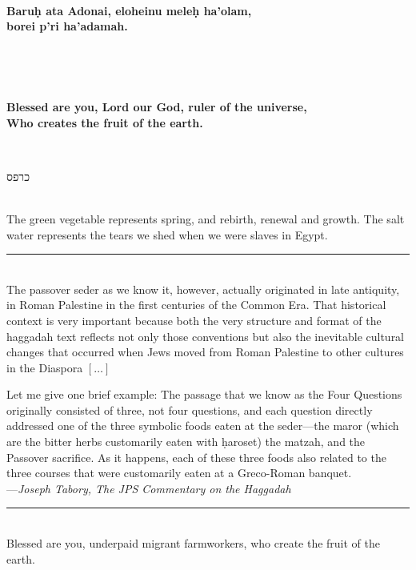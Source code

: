 \documentclass[a4paper,12pt,openany]{memoir}
\newcommand{\HgInst}[1]{{\noindent\sffamily{\bfseries{#1}}}}
\newcommand{\HgEllipsis}{\ensuremath{\left[\ldots\right]}}
\newcommand{\HgSource}[1]{\hfill{\small---\itshape{#1}}}
\newcommand{\hchapter}[1]{
  \begin{hebrew}
    \begin{Spacing}{.97}
      \newpage
      \strut

      \vspace{.15em}

      \noindent\Huge #1

      \vspace{1em}
    \end{Spacing}
  \end{hebrew}
}
\newcommand{\HgHL}[1]{{\Large\textbf{#1}\par\noindent\\[-.5em]}}
\newcommand{\HgFill}{\vfill \hrule \vfill}
\newenvironment{HgEnglish}{\strut\\\noindent}{\vspace{1em}}
\newenvironment{HgTranslit}{\strut\\\noindent\begin{itshape}}{\end{itshape}\vspace{1em}}
\newcommand{\SSrc}{\textsuperscript{\upshape{[S]}}}
\begin{document}
\begin{HgTranslit}
  \HgHL{
  Baru\d{h} ata Adonai, eloheinu mele\d{h} ha'olam, \\
  borei p'ri ha'adamah.
}
\end{HgTranslit}
\vspace{-1em}
\begin{HgEnglish}
  \HgHL{
  Blessed are you, Lord our God, ruler of the universe, \\
  Who creates the fruit of the earth.
  }
\end{HgEnglish}

\HgInst{Eat the parsely.}

\vfill

\hchapter{כרפס}

\begin{HgEnglish}
The green vegetable represents spring, and rebirth, renewal and growth. The salt
water represents the tears we shed when we were slaves in Egypt.
\end{HgEnglish}

\HgFill

\begin{HgEnglish}
  The passover seder as we know it, however, actually originated in late
  antiquity, in Roman Palestine in the first centuries of the Common Era. That
  historical context is very important because both the very structure and
  format of the haggadah text reflects not only those conventions but also the
  inevitable cultural changes that occurred when Jews moved from Roman Palestine
  to other cultures in the Diaspora \HgEllipsis

  Let me give one brief example: The passage that we know as the
  Four Questions originally consisted of three, not four questions, and each
  question directly addressed one of the three symbolic foods eaten at the
  seder---the maror (which are the bitter herbs customarily eaten with
  \d{h}aroset) the matzah, and the Passover sacrifice. As it happens, each of
  these three foods also related to the three courses that were customarily
  eaten at a Greco-Roman banquet. \\

  \HgSource{Joseph Tabory, The JPS Commentary on the Haggadah}
\end{HgEnglish}

\HgFill

\begin{HgEnglish}
  Blessed are you, underpaid migrant farmworkers, who create the fruit of the
  earth.\SSrc
\end{HgEnglish}
\end{document}
